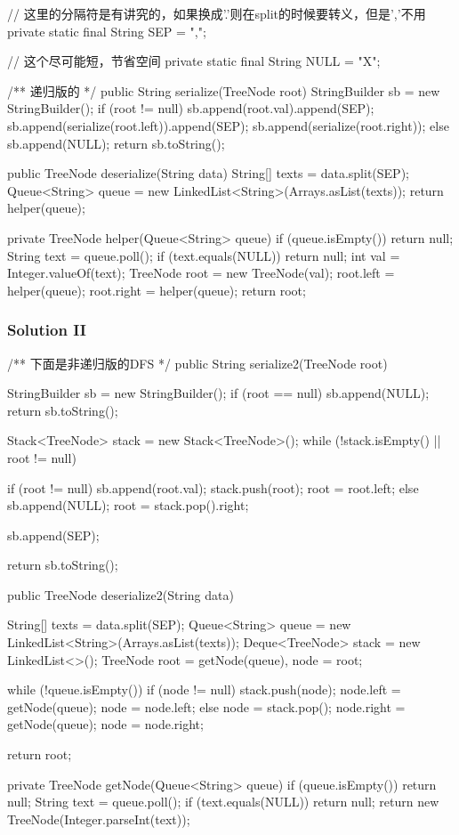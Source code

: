 \begin{Code}
// 这里的分隔符是有讲究的，如果换成'.'则在split的时候要转义，但是','不用
private static final String SEP = ",";

// 这个尽可能短，节省空间
private static final String NULL = "X";

/** 递归版的 */
public String serialize(TreeNode root) {
    StringBuilder sb = new StringBuilder();
    if (root != null) {
        sb.append(root.val).append(SEP);
        sb.append(serialize(root.left)).append(SEP);
        sb.append(serialize(root.right));
    } else {
        sb.append(NULL);
    }
    return sb.toString();
}

public TreeNode deserialize(String data) {
    String[] texts = data.split(SEP);
    Queue<String> queue = new LinkedList<String>(Arrays.asList(texts));
    return helper(queue);
}

private TreeNode helper(Queue<String> queue) {
    if (queue.isEmpty()) {
        return null;
    }
    String text = queue.poll();
    if (text.equals(NULL)) {
        return null;
    }
    int val = Integer.valueOf(text);
    TreeNode root = new TreeNode(val);
    root.left = helper(queue);
    root.right = helper(queue);
    return root;
}
\end{Code}

\newpage

\subsubsection{Solution II}

\begin{Code}
/** 下面是非递归版的DFS */
public String serialize2(TreeNode root) {
    StringBuilder sb = new StringBuilder();
    if (root == null) {
        sb.append(NULL);
        return sb.toString();
    }

    Stack<TreeNode> stack = new Stack<TreeNode>();
    while (!stack.isEmpty() || root != null) {
        if (root != null) {
            sb.append(root.val);
            stack.push(root);
            root = root.left;
        } else {
            sb.append(NULL);
            root = stack.pop().right;
        }

        sb.append(SEP);
    }
    return sb.toString();
}

public TreeNode deserialize2(String data) {
    String[] texts = data.split(SEP);
    Queue<String> queue = new LinkedList<String>(Arrays.asList(texts));
    Deque<TreeNode> stack = new LinkedList<>();
    TreeNode root = getNode(queue), node = root;

    while (!queue.isEmpty()) {
        if (node != null) {
            stack.push(node);
            node.left = getNode(queue);
            node = node.left;
        } else {
            node = stack.pop();
            node.right = getNode(queue);
            node = node.right;
        }
    }

    return root;
}

private TreeNode getNode(Queue<String> queue) {
    if (queue.isEmpty()) {
        return null;
    }
    String text = queue.poll();
    if (text.equals(NULL)) {
        return null;
    }
    return new TreeNode(Integer.parseInt(text));
}
\end{Code}

